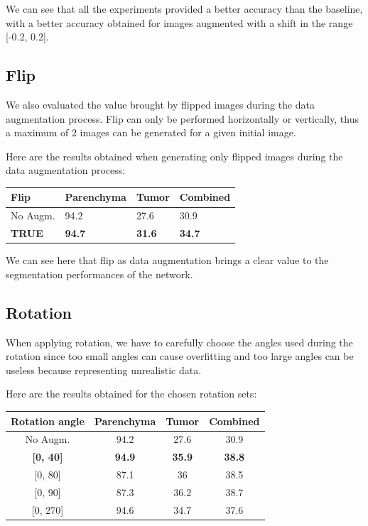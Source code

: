 We can see that all the experiments provided a better accuracy than the
baseline, with a better accuracy obtained for images augmented with a
shift in the range {[}-0.2, 0.2{]}.

\subsection*{Flip}\label{flip}

We also evaluated the value brought by flipped images during the data
augmentation process. Flip can only be performed horizontally or
vertically, thus a maximum of 2 images can be generated for a given
initial image.

Here are the results obtained when generating only flipped images during
the data augmentation process:

\begin{longtable}[c]{@{}llll@{}}
\toprule
\textbf{Flip} & \textbf{Parenchyma} & \textbf{Tumor} &
\textbf{Combined}\tabularnewline
\midrule
\endhead
No Augm. & 94.2 & 27.6 & 30.9\tabularnewline
\textbf{TRUE} & \textbf{94.7} & \textbf{31.6} &
\textbf{34.7}\tabularnewline
\bottomrule
\end{longtable}

We can see here that flip as data augmentation brings a clear value to
the segmentation performances of the network.

\subsection*{Rotation}\label{rotation}

When applying rotation, we have to carefully choose the angles used
during the rotation since too small angles can cause overfitting and too
large angles can be useless because representing unrealistic data.

Here are the results obtained for the chosen rotation sets:

\begin{longtable}[c]{@{}cccc@{}}
\toprule
\textbf{Rotation angle} & \textbf{Parenchyma} & \textbf{Tumor} &
\textbf{Combined}\tabularnewline
\midrule
\endhead
No Augm. & 94.2 & 27.6 & 30.9\tabularnewline
\hline
\textbf{{[}0, 40{]}} & \textbf{94.9} & \textbf{35.9} & \textbf{38.8}\tabularnewline
{[}0, 80{]} & 87.1 & 36 & 38.5\tabularnewline
{[}0, 90{]} & 87.3 & 36.2 & 38.7\tabularnewline
{[}0, 270{]} & 94.6 & 34.7 & 37.6\tabularnewline
\bottomrule
\end{longtable}

